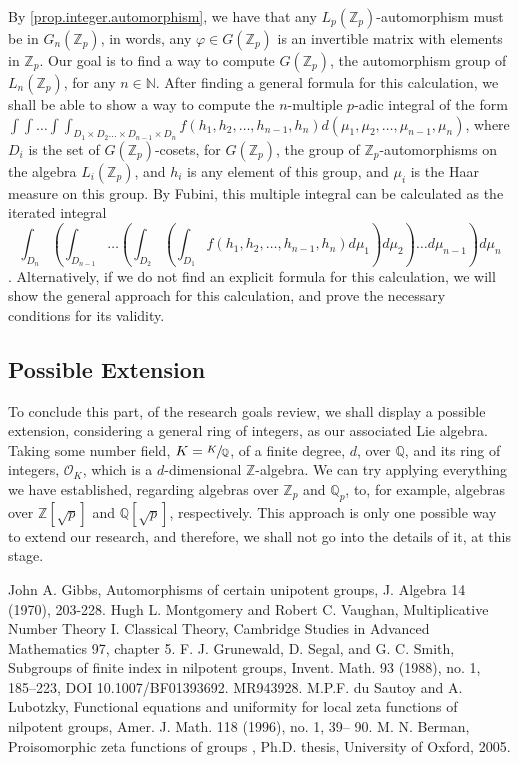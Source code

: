 \documentclass[12pt]{article}
\begin{document}
By \ref{prop.integer.automorphism}, we have that any $L_p(\mathbb{Z}_p)$-automorphism must be in $G_n(\mathbb{Z}_p)$, in words, any $\varphi\in G(\mathbb{Z}_p)$ is an invertible matrix with elements in $\mathbb{Z}_p$. Our goal is to find a way to compute $G(\mathbb{Z}_p)$, the automorphism group of $L_n(\mathbb{Z}_p)$, for any $n\in\mathbb{N}$. After finding a general formula for this calculation, we shall be able to show a way to compute the $n$-multiple $p$-adic integral of the form $\displaystyle\int\int\dots\int\int_{D_1\times D_2\dots\times D_{n-1}\times D_n}f(h_1,h_2,\dots,h_{n-1},h_n)d(\mu_1,\mu_2,\dots,\mu_{n-1},\mu_n)$, where $D_i$ is the set of $G(\mathbb{Z}_p)$-cosets, for $G(\mathbb{Z}_p)$, the group of $\mathbb{Z}_p$-automorphisms on the algebra $L_i(\mathbb{Z}_p)$, and $h_i$ is any element of this group, and $\mu_i$ is the Haar measure on this group. By Fubini, this multiple integral can be calculated as the iterated integral $$\displaystyle\int_{D_n}\left(\int_{D_{n-1}}\dots\left(\int_{D_2}\left(\int_{D_1}f(h_1,h_2,\dots,h_{n-1},h_n)d\mu_1\right)d\mu_2\right)\dots d\mu_{n-1}\right)d\mu_n$$. Alternatively, if we do not find an explicit formula for this calculation, we will show the general approach for this calculation, and prove the necessary conditions for its validity. 
\subsection{Possible Extension}
To conclude this part, of the research goals review, we shall display a possible extension, considering a general ring of integers, as our associated Lie algebra. Taking some number field, $K=\sfrac{K}{\mathbb{Q}}$, of a finite degree, $d$, over $\mathbb{Q}$, and its ring of integers, $\mathcal{O}_K$, which is a $d$-dimensional $\mathbb{Z}$-algebra. We can try applying everything we have established, regarding algebras over $\mathbb{Z}_p$ and $\mathbb{Q}_p$, to, for example, algebras over $\mathbb{Z}[\sqrt{p}]$ and $\mathbb{Q}[\sqrt{p}]$, respectively. This approach is only one possible way to extend our research, and therefore, we shall not go into the details of it, at this stage.
\begin{thebibliography}{2}

 John A. Gibbs, Automorphisms of certain unipotent groups, J. Algebra 14 (1970), 203-228.
 Hugh L. Montgomery and Robert C. Vaughan, Multiplicative Number Theory I. Classical Theory, Cambridge Studies in Advanced Mathematics 97, chapter 5.
 F. J. Grunewald, D. Segal, and G. C. Smith, Subgroups of finite index in nilpotent groups,
Invent. Math. 93 (1988), no. 1, 185–223, DOI 10.1007/BF01393692. MR943928.
 M.P.F. du Sautoy and A. Lubotzky, Functional equations and uniformity for
local zeta functions of nilpotent groups, Amer. J. Math. 118 (1996), no. 1, 39–
90.
 M. N. Berman,
Proisomorphic zeta functions of groups
, Ph.D. thesis, University of Oxford,
2005.
\end{thebibliography}
\end{document}
